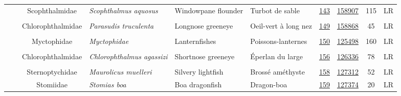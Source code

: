 \documentclass[12pt]{article}\usepackage[]{graphicx}\usepackage[]{color}
\begin{document}
\begin{landscape}
\begin{longtable}[t]{ccc>{\centering\arraybackslash}p{3cm}>{\centering\arraybackslash}p{3cm}>{\centering\arraybackslash}p{3cm}>{}c>{}ccc}
\nopagebreak
\hspace{1em}\hspace{1em} &  & Scophthalmidae & \em{Scophthalmus aquosus} & Windowpane flounder & Turbot de sable & \href{#sec:143}{143} & \href{http://www.marinespecies.org/aphia.php?p=taxdetails&id=158907}{158907} & 115 & LR\\
\nopagebreak
\addlinespace[0.3em]
\\
\hspace{1em}\hspace{1em} &  & Chlorophthalmidae & \em{Parasudis truculenta} & Longnose greeneye & Oeil-vert à long nez & \href{#sec:149}{149} & \href{http://www.marinespecies.org/aphia.php?p=taxdetails&id=158868}{158868} & 45 & LR\\
\nopagebreak
\addlinespace[0.3em]
\\
\hspace{1em}\hspace{1em} &  & Myctophidae & \em{Myctophidae} & Lanternfishes & Poissons-lanternes & \href{#sec:150}{150} & \href{http://www.marinespecies.org/aphia.php?p=taxdetails&id=125498}{125498} & 160 & LR\\
\nopagebreak
\addlinespace[0.3em]
\\
\hspace{1em}\hspace{1em} &  & Chlorophthalmidae & \em{Chlorophthalmus agassizi} & Shortnose greeneye & Éperlan du large & \href{#sec:156}{156} & \href{http://www.marinespecies.org/aphia.php?p=taxdetails&id=126336}{126336} & 78 & LR\\
\nopagebreak
\addlinespace[0.3em]
\\
\hspace{1em}\hspace{1em} &  & Sternoptychidae & \em{Maurolicus muelleri} & Silvery lightfish & Brossé améthyste & \href{#sec:158}{158} & \href{http://www.marinespecies.org/aphia.php?p=taxdetails&id=127312}{127312} & 52 & LR\\
\nopagebreak
\hspace{1em}\hspace{1em} &  & Stomiidae & \em{Stomias boa} & Boa dragonfish & Dragon-boa & \href{#sec:159}{159} & \href{http://www.marinespecies.org/aphia.php?p=taxdetails&id=127374}{127374} & 20 & LR\\

\end{longtable}
\end{landscape}
\end{document}
